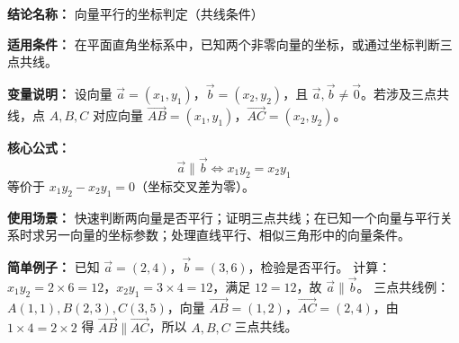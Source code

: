 \textbf{结论名称：} 向量平行的坐标判定（共线条件）

\textbf{适用条件：} 在平面直角坐标系中，已知两个非零向量的坐标，或通过坐标判断三点共线。

\textbf{变量说明：} 设向量 \(\vec{a}=(x_1,y_1)\)，\(\vec{b}=(x_2,y_2)\)，且 \(\vec{a},\vec{b}\neq\vec{0}\)。若涉及三点共线，点 \(A,B,C\) 对应向量 \(\overrightarrow{AB}=(x_1,y_1)\)，\(\overrightarrow{AC}=(x_2,y_2)\)。

\textbf{核心公式：} 
\[
\vec{a}\parallel\vec{b} \iff \boxed{x_1y_2 = x_2y_1}
\]
等价于 \(x_1y_2 - x_2y_1 = 0\)（坐标交叉差为零）。

\textbf{使用场景：} 快速判断两向量是否平行；证明三点共线；在已知一个向量与平行关系时求另一向量的坐标参数；处理直线平行、相似三角形中的向量条件。

\textbf{简单例子：} 
已知 \(\vec{a}=(2,4)\)，\(\vec{b}=(3,6)\)，检验是否平行。
计算：\(x_1y_2=2\times6=12\)，\(x_2y_1=3\times4=12\)，满足 \(12=12\)，故 \(\vec{a}\parallel\vec{b}\)。
三点共线例：\(A(1,1), B(2,3), C(3,5)\)，向量 \(\overrightarrow{AB}=(1,2)\)，\(\overrightarrow{AC}=(2,4)\)，由 \(1\times4=2\times2\) 得 \(\overrightarrow{AB}\parallel\overrightarrow{AC}\)，所以 \(A,B,C\) 三点共线。